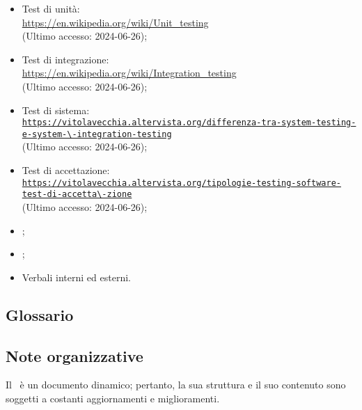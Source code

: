 \begin{itemize}
  \item Test di unità: \\ \href{https://en.wikipedia.org/wiki/Unit_testing}{https://en.wikipedia.org/wiki/Unit\_testing}  \\ (Ultimo accesso: 2024-06-26);
  \item Test di integrazione: \\ \href{https://en.wikipedia.org/wiki/Integration_testing}{https://en.wikipedia.org/wiki/Integration\_testing}  \\ (Ultimo accesso: 2024-06-26);
  \item Test di sistema: \\ \href{https://vitolavecchia.altervista.org/differenza-tra-system-testing-e-system-integration-testing}{\nolinkurl{https://vitolavecchia.altervista.org/differenza-tra-system-testing-e-system-\-integration-testing}}  \\ (Ultimo accesso: 2024-06-26);
  \item Test di accettazione: \\ \href{https://vitolavecchia.altervista.org/tipologie-testing-software-test-di-accettazione}{\nolinkurl{https://vitolavecchia.altervista.org/tipologie-testing-software-test-di-accetta\-zione}}  \\ (Ultimo accesso: 2024-06-26);
  \item \Glossario;
  \item \PianoDiProgetto;
  \item Verbali interni ed esterni.
\end{itemize}

\subsection{Glossario} 
\GlossarioIntroduzione

\subsection{Note organizzative}
Il \PdQ\ è un documento dinamico; pertanto, la sua struttura e il suo contenuto sono soggetti a costanti aggiornamenti e miglioramenti.
